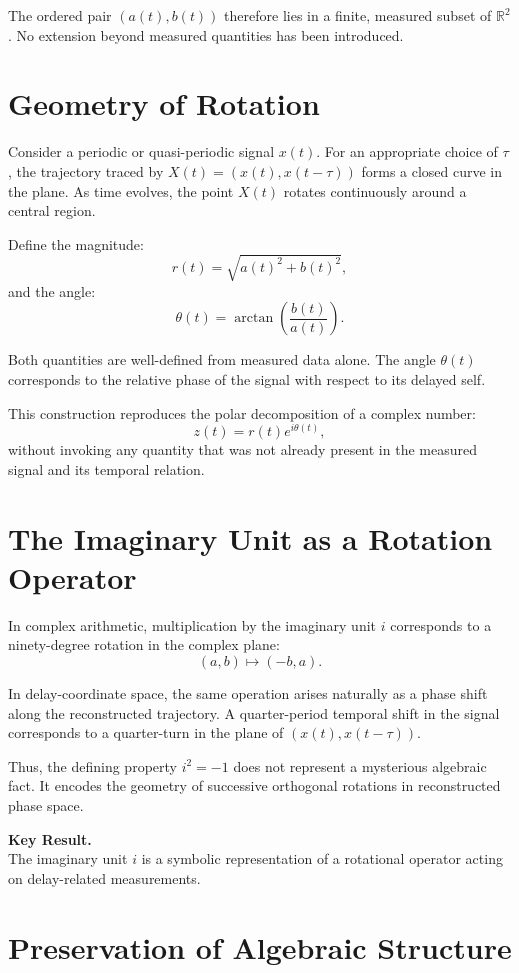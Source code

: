 \documentclass[12pt]{book}  %
\begin{document}
The ordered pair \( (a(t), b(t)) \) therefore lies in a finite, measured subset of \( \mathbb{R}^2 \). No extension beyond measured quantities has been introduced.

\section*{Geometry of Rotation}

Consider a periodic or quasi-periodic signal \( x(t) \). For an appropriate choice of \( \tau \), the trajectory traced by \( X(t) = (x(t), x(t - \tau)) \) forms a closed curve in the plane. As time evolves, the point \( X(t) \) rotates continuously around a central region.

Define the magnitude:
\[
r(t) = \sqrt{a(t)^2 + b(t)^2},
\]
and the angle:
\[
\theta(t) = \arctan\left( \frac{b(t)}{a(t)} \right).
\]

Both quantities are well-defined from measured data alone. The angle \( \theta(t) \) corresponds to the relative phase of the signal with respect to its delayed self.

This construction reproduces the polar decomposition of a complex number:
\[
z(t) = r(t) e^{i \theta(t)},
\]
without invoking any quantity that was not already present in the measured signal and its temporal relation.

\section*{The Imaginary Unit as a Rotation Operator}

In complex arithmetic, multiplication by the imaginary unit \( i \) corresponds to a ninety-degree rotation in the complex plane:
\[
(a, b) \mapsto (-b, a).
\]

In delay-coordinate space, the same operation arises naturally as a phase shift along the reconstructed trajectory. A quarter-period temporal shift in the signal corresponds to a quarter-turn in the plane of \( (x(t), x(t - \tau)) \).

Thus, the defining property \( i^2 = -1 \) does not represent a mysterious algebraic fact. It encodes the geometry of successive orthogonal rotations in reconstructed phase space.

\textbf{Key Result.}\\
The imaginary unit \( i \) is a symbolic representation of a rotational operator acting on delay-related measurements.

\section*{Preservation of Algebraic Structure}
\end{document}
